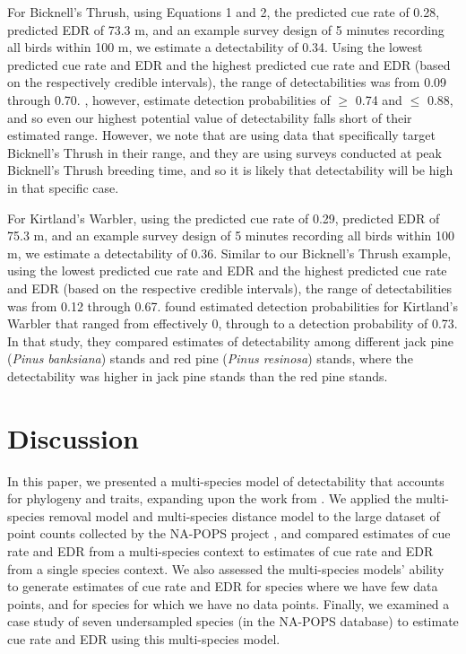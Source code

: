 \documentclass[12pt]{article}
\begin{document}
\par For Bicknell's Thrush, using Equations 1 and 2, the predicted cue rate of 0.28, predicted EDR of 73.3 m, and an example survey design of 5 minutes recording all birds within 100 m, we estimate a detectability of 0.34.
Using the lowest predicted cue rate and EDR and the highest predicted cue rate and EDR (based on the respectively credible intervals), the range of detectabilities was from 0.09 through 0.70.
\citet{aubry_bicknells_2018}, however, estimate detection probabilities of $\geq$ 0.74 and $\leq$ 0.88, and so even our highest potential value of detectability falls short of their estimated range.
However, we note that \citet{aubry_bicknells_2018} are using data that specifically target Bicknell's Thrush in their range, and they are using surveys conducted at peak Bicknell's Thrush breeding time, and so it is likely that detectability will be high in that specific case.

\par For Kirtland’s Warbler, using the predicted cue rate of 0.29, predicted EDR of 75.3 m, and an example survey design of 5 minutes recording all birds within 100 m, we estimate a detectability of 0.36.
Similar to our Bicknell’s Thrush example, using the lowest predicted cue rate and EDR and the highest predicted cue rate and EDR (based on the respective credible intervals), the range of detectabilities was from 0.12 through 0.67.
\citet{van_dyke_comparative_2022} found estimated detection probabilities for Kirtland’s Warbler that ranged from effectively 0, through to a detection probability of 0.73.
In that study, they compared estimates of detectability among different jack pine (\textit{Pinus banksiana}) stands and red pine (\textit{Pinus resinosa}) stands, where the detectability was higher in jack pine stands than the red pine stands.

\section{Discussion}

\par In this paper, we presented a multi-species model of detectability that accounts for phylogeny and traits, expanding upon the work from \citet{solymos_phylogeny_2018}.
We applied the multi-species removal model and multi-species distance model to the large dataset of point counts collected by the NA-POPS project \citep{edwards_point_2023}, and compared estimates of cue rate and EDR from a multi-species context to estimates of cue rate and EDR from a single species context.
We also assessed the multi-species models' ability to generate estimates of cue rate and EDR for species where we have few data points, and for species for which we have no data points.
Finally, we examined a case study of seven undersampled species (in the NA-POPS database) to estimate cue rate and EDR using this multi-species model.
\end{document}
